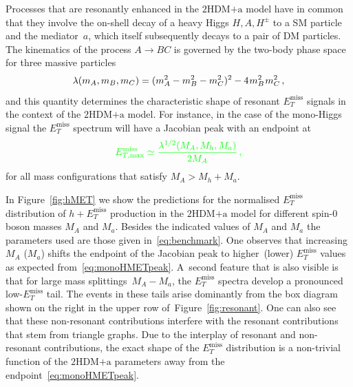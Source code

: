 \documentclass[a4paper, 11pt,notoc]{article}
\newcommand{\MET}{\ensuremath{E_T^\mathrm{miss}}\xspace}
\newcommand{\mA}{\ensuremath{M_{A}}\xspace}
\newcommand{\ma}{\ensuremath{M_{a}}\xspace}
\newcommand{\hdma}{\ensuremath{\textrm{2HDM+a}}\xspace}
\begin{document}
Processes that are resonantly enhanced in the \hdma model have in common that they involve the on-shell decay of a heavy Higgs $H,A,H^\pm$ to a SM particle and the mediator~$a$, which   itself  subsequently decays to a pair of DM particles. The kinematics of the process $A \to B C$ is governed by the two-body phase space for three massive particles 
\begin{equation} \label{eq:twophasespace}
\lambda(m_A, m_B, m_C) = (m_A^2 -m_B^2-m_C^2)^2 -  4 \hspace{0.25mm} m_B^2 \hspace{0.25mm}  m_C^2 \,,
\end{equation}
and this quantity determines the characteristic shape of resonant $\MET$ signals in the context of the \hdma model. For instance, in the case of the mono-Higgs signal the $\MET$ spectrum  will have a Jacobian peak with an endpoint at~\cite{No:2015xqa,Bauer:2017ota}
\begin{equation} \label{eq:monoHMETpeak}
\color{green} E^{\rm{miss}}_{T, {\rm max} } \simeq \frac{\lambda^{1/2}(M_A, M_h, M_a)}{2 M_A}\,, 
\end{equation}
for all mass configurations that satisfy $M_A > M_h + M_a$. 

In Figure~\ref{fig:hMET} we show the predictions for the normalised $\MET$ distribution of $h+\MET$ production in the \hdma model for different {\color{red} spin-0 boson} masses $\mA$ and $\ma$. Besides the indicated values of $\mA$ and $\ma$ the parameters  used  are those given in~\eqref{eq:benchmark}. {\color{red} One observes that increasing~$\mA$ ($\ma$) shifts the endpoint of the Jacobian peak to higher~(lower) $\MET$  values as expected from~\eqref{eq:monoHMETpeak}.} {\color{blue} A~second feature that is also visible is that for large mass splittings~$\mA - \ma$, the $\MET$ spectra develop a pronounced low-$\MET$ tail.} The events in these tails arise dominantly from the box diagram shown on the right in the upper row of~Figure~\ref{fig:resonant}. One can also see that these non-resonant contributions interfere with the resonant contributions that stem from triangle graphs. {\color{green} Due to the interplay of resonant and non-resonant contributions,  the exact shape of the $\MET$ distribution is a non-trivial function of the \hdma parameters away from the endpoint~\eqref{eq:monoHMETpeak}.}  
\end{document}
